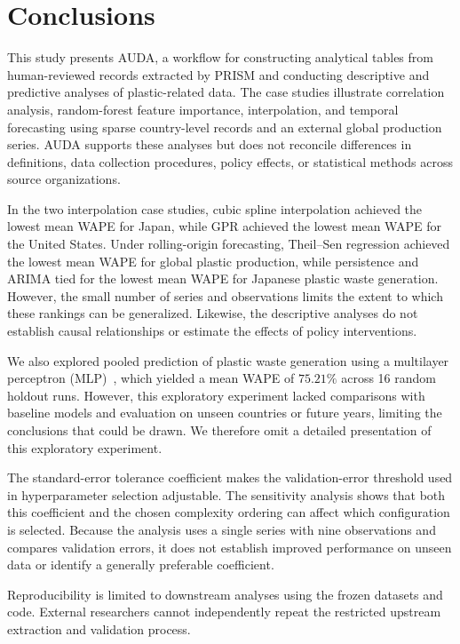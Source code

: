 \section{Conclusions}

This study presents AUDA, a workflow for constructing analytical tables from human-reviewed records extracted by PRISM and conducting descriptive and predictive analyses of plastic-related data.
The case studies illustrate correlation analysis, random-forest feature importance, interpolation, and temporal forecasting using sparse country-level records and an external global production series.
AUDA supports these analyses but does not reconcile differences in definitions, data collection procedures, policy effects, or statistical methods across source organizations.

In the two interpolation case studies, cubic spline interpolation achieved the lowest mean WAPE for Japan, while GPR achieved the lowest mean WAPE for the United States.
Under rolling-origin forecasting, Theil--Sen regression achieved the lowest mean WAPE for global plastic production, while persistence and ARIMA tied for the lowest mean WAPE for Japanese plastic waste generation.
However, the small number of series and observations limits the extent to which these rankings can be generalized.
Likewise, the descriptive analyses do not establish causal relationships or estimate the effects of policy interventions.

We also explored pooled prediction of plastic waste generation using a multilayer perceptron (MLP)~\cite{goodfellow2016deep}, which yielded a mean WAPE of \(75.21\%\) across 16 random holdout runs.
However, this exploratory experiment lacked comparisons with baseline models and evaluation on unseen countries or future years, limiting the conclusions that could be drawn.
We therefore omit a detailed presentation of this exploratory experiment.

The standard-error tolerance coefficient makes the validation-error threshold used in hyperparameter selection adjustable.
The sensitivity analysis shows that both this coefficient and the chosen complexity ordering can affect which configuration is selected.
Because the analysis uses a single series with nine observations and compares validation errors, it does not establish improved performance on unseen data or identify a generally preferable coefficient.

Reproducibility is limited to downstream analyses using the frozen datasets and code.
External researchers cannot independently repeat the restricted upstream extraction and validation process.

